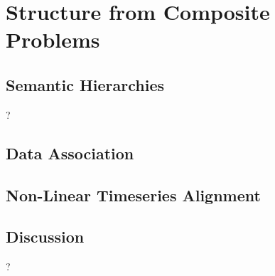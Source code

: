 \chapter{Structure from Composite Problems}
\label{cha:structure_from_composite_problems}


\section{Semantic Hierarchies}
\label{sec:semantic_hierarchies}
?


\section{Data Association}
\label{sec:data_association}


\section{Non-Linear Timeseries Alignment}
\label{sec:non_linear_timeseries_alignment}


\section{Discussion}
\label{sec:discussion}
?
